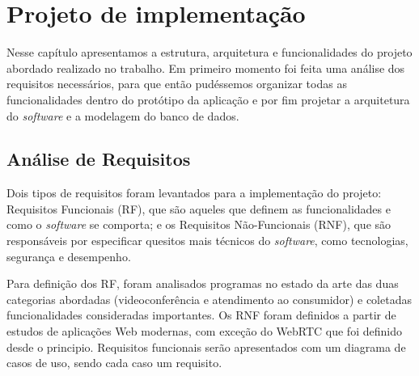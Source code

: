 \chapter[Projeto de implementação]{Projeto de implementação}\label{chap:projeto}

Nesse capítulo apresentamos a estrutura, arquitetura e funcionalidades do projeto abordado realizado no trabalho. 
Em primeiro momento foi feita uma análise dos requisitos necessários, para que então pudéssemos organizar todas as funcionalidades dentro do protótipo da aplicação e por fim projetar a arquitetura do \textit{software} e a modelagem do banco de dados.

\section{Análise de Requisitos}

Dois tipos de requisitos foram levantados para a implementação do projeto: Requisitos Funcionais (RF), que são aqueles que definem as funcionalidades e como o \textit{software} se comporta; e os Requisitos Não-Funcionais (RNF), que são responsáveis por especificar quesitos mais técnicos do \textit{software}, como tecnologias, segurança e desempenho. 

Para definição dos RF, foram analisados programas no estado da arte das duas categorias abordadas (videoconferência e atendimento ao consumidor) e coletadas funcionalidades consideradas importantes. Os RNF foram definidos a partir de estudos de aplicações Web modernas, com exceção do WebRTC que foi definido desde o principio. Requisitos funcionais serão apresentados com um diagrama de casos de uso, sendo cada caso um requisito. 

